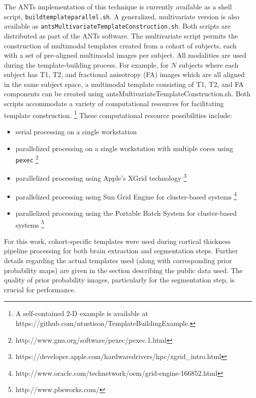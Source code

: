 The ANTs implementation of this technique is currently available as a shell script, 
{\tt buildtemplateparallel.sh}.  A generalized, multivariate version is also available as
{\tt antsMultivariateTemplateConstruction.sh}.  Both scripts are distributed as part of
 the ANTs software.  The multivariate script permits the construction of multimodal templates
created from a cohort of subjects, each with a set of pre-aligned multimodal images per subject.  
All modalities are used during the template-building process.  For example, for $N$ subjects where 
each subject has T1, T2, and fractional anisotropy (FA) images which are all aligned in the same subject space, 
a multimodal template consisting 
of T1, T2, and FA components can be created using antsMultivariateTemplateConstruction.sh.
Both scripts accommodate a variety of computational resources
for facilitating template construction.%
\footnote{
A self-contained 2-D example is available at https://github.com/ntustison/TemplateBuildingExample.
}
These computational resource possibilities include:
\begin{itemize}
  \item serial processing on a single workstation
  \item parallelized processing on a single workstation with multiple cores using \verb#pexec#%
  \footnote{http://www.gnu.org/software/pexec/pexec.1.html}
  \item parallelized processing using Apple's XGrid technology%
  \footnote{https://developer.apple.com/hardwaredrivers/hpc/xgrid\_intro.html}
  \item parallelized processing using Sun Grid Engine for cluster-based systems%
  \footnote{http://www.oracle.com/technetwork/oem/grid-engine-166852.html}
  \item parallelized processing using the Portable Batch System for cluster-based systems%
  \footnote{http://www.pbsworks.com/}  
\end{itemize}

For this work, cohort-specific templates were used during cortical thickness pipeline
processing for both brain extraction and segmentation steps.  Further details regarding
the actual templates used (along with corresponding prior probability maps) are given 
in the section describing the public data used.  The quality of prior probability images,
particularly for the segmentation step, is crucial for performance.  

